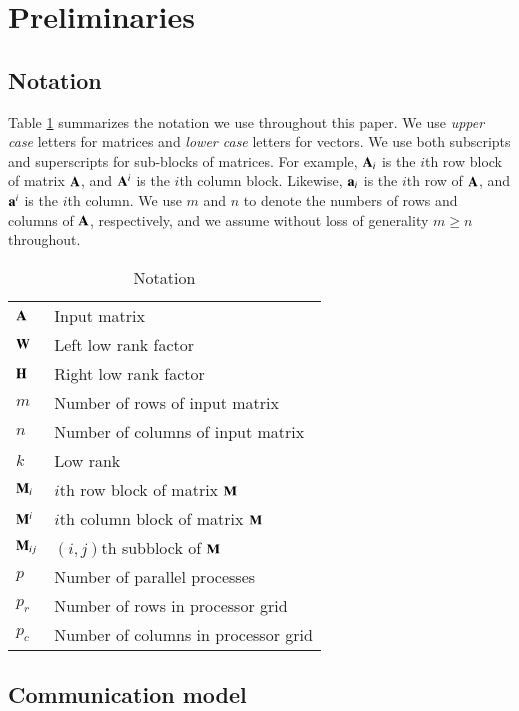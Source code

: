 \section{Preliminaries}

\subsection{Notation}
\label{sec:notations}

Table \ref{tab:notation} summarizes the notation we use throughout this paper.
We use \emph{upper case} letters for matrices and \emph{lower case} letters for vectors.
We use both subscripts and superscripts for sub-blocks of matrices. 
For example, $\AA_i$ is the $i$th row block of matrix $\AA$, and $\AA^i$ is the $i$th column block.
Likewise, $\aa_i$ is the $i$th row of $\AA$, and $\aa^i$ is the $i$th column.
We use $m$ and $n$ to denote the numbers of rows and columns of $\AA$, respectively, and we assume without loss of generality $m\geq n$ throughout.

\begin{table}%
\begin{center}
\begin{tabular}{|l|l|}
\hline
$\AA$ & Input matrix \\
$\WW$ & Left low rank factor \\
$\HH$ & Right low rank factor \\
$m$ & Number of rows of input matrix \\
$n$ & Number of columns of input matrix \\
$k$ & Low rank \\
$\M{M}_i$ & $i$th row block of matrix $\M{M}$ \\
$\M{M}^i$ & $i$th column block of matrix $\M{M}$  \\
$\M{M}_{ij}$ & $(i,j)$th subblock of $\M{M}$ \\
$p$ & Number of parallel processes \\
$p_r$ & Number of rows in processor grid \\
$p_c$ & Number of columns in processor grid \\
\hline
\end{tabular}
\end{center}
\caption{Notation}
\label{tab:notation}
\end{table}%

\subsection{Communication model}
\label{sec:comm-model}

